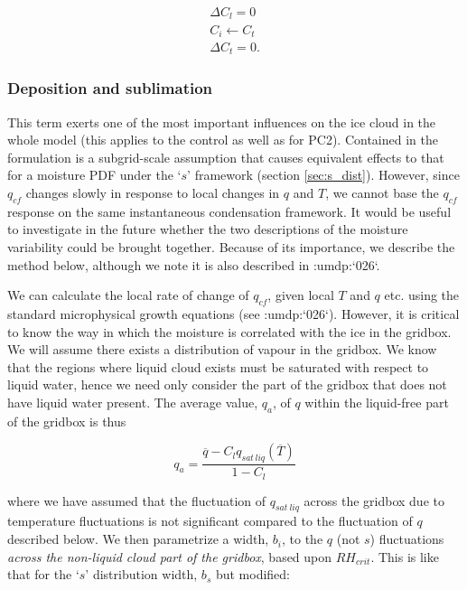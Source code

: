 \documentclass{UMDP_article}
\newcommand{\citeumdp}[1]{:umdp:`#1`}
\begin{document}
\begin{eqnarray}
\Delta C_l = 0  \nonumber \\
C_i \leftarrow C_t \nonumber \\
\Delta C_t = 0.
\label{eq:lsp_het}
\end{eqnarray}

\subsubsection{Deposition and sublimation}
\label{sec:mp_depsub}
This term exerts one of the most important influences on the ice cloud in
the whole model (this applies to the control as well as for PC2). Contained
in the formulation is a subgrid-scale assumption that causes equivalent 
effects to that for a moisture PDF under the `$s$' framework
(section \ref{sec:s_dist}). However, since ${q_{cf}}$ changes
slowly in response to local changes in $q$ and $T$, we cannot base the
$q_{cf}$ response on the same instantaneous condensation framework. It would
be useful to investigate in the future whether the two descriptions of the
moisture variability could be brought together. 
Because of its importance,
we describe the method below, although we note it is also described in
\citeumdp{026}.

We can calculate the local rate of change of $q_{cf}$, given local $T$ and $q$
etc. using the standard microphysical growth equations (see \citeumdp{026}). 
However, it is critical to know the way in which
the moisture is correlated with the ice in the gridbox. We will assume
there exists a distribution of vapour in the gridbox. We know that
the regions where liquid cloud exists must be saturated with respect
to liquid water, hence we need only consider the part of the gridbox
that does not have liquid water present. The average value, $q_a$,
of $q$ within the liquid-free part of the gridbox is thus

\begin{equation}
q_a = \frac{  \overline{q} - C_l q_{sat \, liq}(\overline{T}) } {1 - C_l}
\label{eq:qa}
\end{equation}

where we have assumed that the fluctuation of $q_{sat~liq}$ across
the gridbox due to temperature fluctuations is not significant compared
to the fluctuation of $q$ described below. We then parametrize a width, $b_i$,
to the $q$ (not $s$) fluctuations \textit{across the non-liquid cloud part
of the gridbox}, based upon $RH_{crit}$. This is like that for the `$s$'
distribution width, $b_s$ but modified:
\end{document}
